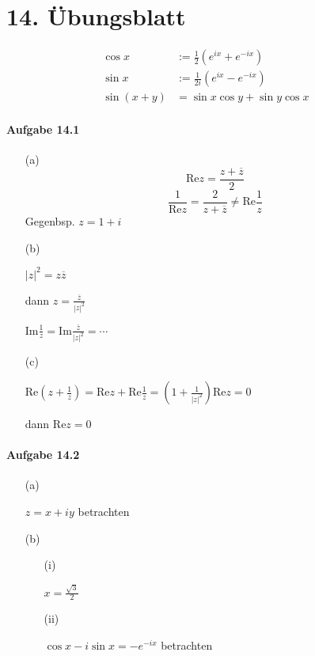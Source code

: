 \section{14. Übungsblatt}

\begin{align*}
\cos x&:=\frac{1}{2}(e^{ix}+e^{-ix})\\
\sin x&:=\frac{1}{2i}(e^{ix}-e^{-ix})\\
\sin(x+y)&=\sin x\cos y+\sin y\cos x
\end{align*}

\paragraph{Aufgabe 14.1}

\begin{enumerate}

\item[(a)]
\begin{equation*}
\mathrm{Re}z=\frac{z+\overline{z}}{2}
\end{equation*}
\begin{equation*}
\frac{1}{\mathrm{Re}z}=\frac{2}{z+\overline{z}}\neq\mathrm{Re}\frac{1}{z}
\end{equation*}
Gegenbsp. $z=1+i$

\item[(b)]

$|z|^2=z\overline{z}$

dann $z=\frac{\overline{z}}{|z|^2}$

$\mathrm{Im}\frac{1}{z}=\mathrm{Im}\frac{\overline{z}}{|z|^2}=\cdots$

\item[(c)]

$\mathrm{Re}(z+\frac{1}{z})=\mathrm{Re}z+\mathrm{Re}\frac{1}{z}=(1+\frac{1}{|z|^2})\mathrm{Re}z=0$

dann $\mathrm{Re}z=0$

\end{enumerate}

\paragraph{Aufgabe 14.2}

\begin{enumerate}

\item[(a)]

$z=x+iy$ betrachten

\item[(b)]

\begin{enumerate}

\item[(i)]

$x=\frac{\sqrt{3}}{2}$

\item[(ii)]

$\cos x-i\sin x=-e^{-ix}$ betrachten

\end{enumerate}

\end{enumerate}

